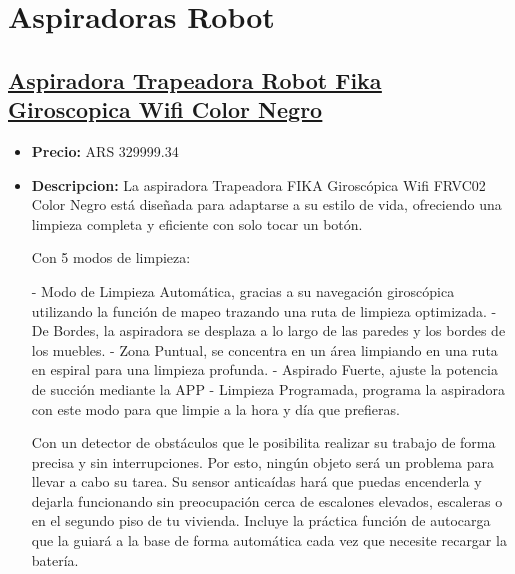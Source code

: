 \documentclass{article}
\begin{document}
    
    \section*{Aspiradoras Robot}
    \setcounter{subsection}{0} %
    
    \begin{adjustwidth}{2em}{}

    \subsection{\underline{\href{https://www.mercadolibre.com.ar/aspiradora-trapeadora-robot-fika-giroscopica-wifi-color-negro/p/MLA29751158}{Aspiradora Trapeadora Robot Fika Giroscopica Wifi Color Negro}}}
    \begin{itemize}
        \item \textbf{Precio:} ARS 329999.34
        \item \textbf{Descripcion:} La aspiradora Trapeadora FIKA Giroscópica Wifi FRVC02 Color Negro está diseñada para adaptarse a su estilo de vida, ofreciendo una limpieza completa y eficiente con solo tocar un botón.

Con 5 modos de limpieza:

- Modo de Limpieza Automática, gracias a su navegación giroscópica utilizando la función de mapeo trazando una ruta de limpieza optimizada.
- De Bordes, la aspiradora se desplaza a lo largo de las paredes y los bordes de los muebles. 
- Zona Puntual, se concentra en un área limpiando en una ruta en espiral para una limpieza profunda.
- Aspirado Fuerte, ajuste la potencia de succión mediante la APP
- Limpieza Programada, programa la aspiradora con este modo para que limpie a la hora y día que prefieras. 

Con un detector de obstáculos que le posibilita realizar su trabajo de forma precisa y sin interrupciones. Por esto, ningún objeto será un problema para llevar a cabo su tarea. 
Su sensor anticaídas hará que puedas encenderla y dejarla funcionando sin preocupación cerca de escalones elevados, escaleras o en el segundo piso de tu vivienda. Incluye la práctica función de autocarga que la guiará a la base de forma automática cada vez que necesite recargar la batería.


\end{itemize}
\end{adjustwidth}
\end{document}
